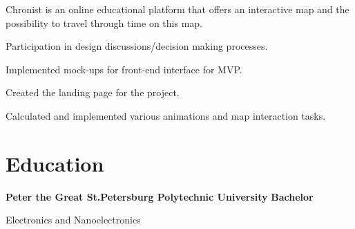 \documentclass[11pt, a4paper]{article}
\newcommand{\cvdate}[1]{
  {\small\narrower\normalfont\color{ColorGrey2}{#1}}
}
\newcommand{\cvposition}[1]{\normalsize\textbf{#1}}
\newcommand{\cvcompany}[1]{\Large\textbf{#1}}
\newcommand{\cventry}[3]{
  \cvcompany{#1} \hfill \break
  \cvposition{#2} \hfill \cvdate{#3}\break 
  \vspace{-1em}
}
\newcommand{\cvlistitem}[1]{
  \begin{minipage}[t]{\textwidth}
  \strut\hspace{0.5em}\textcolor{ColorBlue}{\large\rmfamily\textbullet}\hspace{0.5em}#1
  \vspace{2pt}
  \end{minipage}
}
\begin{document}
Chronist is an online educational platform that offers an interactive map and the possibility to travel through time on this map.

\cvlistitem{Participation in design discussions/decision making processes.}
\cvlistitem{Implemented mock-ups for front-end interface for MVP.}
\cvlistitem{Created the landing page for the project.}
\cvlistitem{Calculated and implemented various animations and map interaction tasks.}

\section{Education}

\cventry{Peter the Great St.Petersburg Polytechnic University}{Bachelor}{Sep, 2008 -- Jun, 2016}
\cvlistitem{Electronics and Nanoelectronics}
\end{document}
